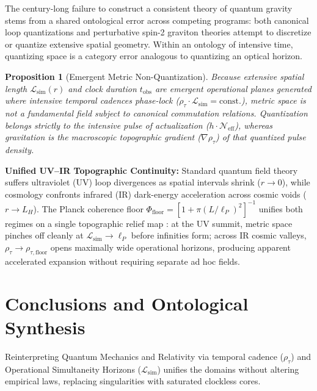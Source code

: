 \documentclass[11pt,a4paper]{article}
\newtheorem{proposition}{Proposition}[section]
\begin{document}
The century-long failure to construct a consistent theory of quantum gravity stems from a shared ontological error across competing programs: both canonical loop quantizations and perturbative spin-2 graviton theories attempt to discretize or quantize extensive spatial geometry. Within an ontology of intensive time, quantizing space is a category error analogous to quantizing an optical horizon.

\begin{proposition}[Emergent Metric Non-Quantization]
Because extensive spatial length $\mathcal{L}_{\mathrm{sim}}(r)$ and clock duration $t_{\mathrm{obs}}$ are emergent operational planes generated where intensive temporal cadences phase-lock ($\rho_\tau \cdot \mathcal{L}_{\mathrm{sim}} = \mathrm{const.}$), metric space is not a fundamental field subject to canonical commutation relations. Quantization belongs strictly to the intensive pulse of actualization ($h \cdot \mathcal{N}_{\mathrm{eff}}$), whereas gravitation is the macroscopic topographic gradient ($\nabla \rho_\tau$) of that quantized pulse density.
\end{proposition}

\noindent\textbf{Unified UV--IR Topographic Continuity:} Standard quantum field theory suffers ultraviolet (UV) loop divergences as spatial intervals shrink ($r \to 0$), while cosmology confronts infrared (IR) dark-energy acceleration across cosmic voids ($r \to L_H$). The Planck coherence floor $\Phi_{\mathrm{floor}} = [1 + \pi(L/\ell_P)^2]^{-1}$ unifies both regimes on a single topographic relief map \cite{DamasioP16}: at the UV summit, metric space pinches off cleanly at $\mathcal{L}_{\mathrm{sim}} \to \ell_P$ before infinities form; across IR cosmic valleys, $\rho_\tau \to \rho_{\tau,\mathrm{floor}}$ opens maximally wide operational horizons, producing apparent accelerated expansion without requiring separate ad hoc fields.

\section{Conclusions and Ontological Synthesis}

Reinterpreting Quantum Mechanics and Relativity via temporal cadence ($\rho_\tau$) and Operational Simultaneity Horizons ($\mathcal{L}_{\mathrm{sim}}$) unifies the domains without altering empirical laws, replacing singularities with saturated clockless cores.
\end{document}
